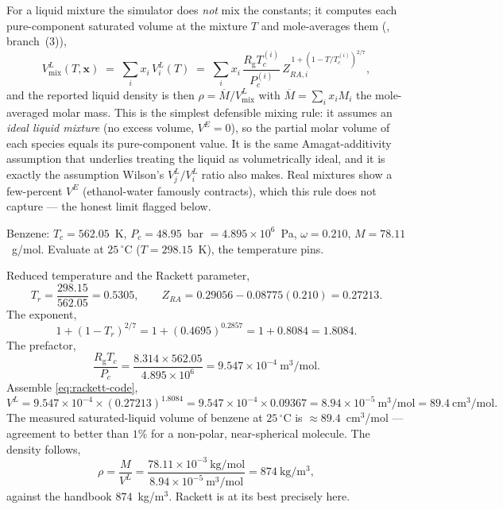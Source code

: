 \documentclass[11pt,a4paper]{article}
\newcommand{\Rgas}{R_{\!\mathrm{g}}}                %
\begin{document}
For a liquid mixture the simulator does \emph{not} mix the constants;
it computes each pure-component saturated volume at the mixture $T$ and
mole-averages them (, branch~(3)),
\begin{equation}\label{eq:rackett-mix}
   V^{L}_{\mathrm{mix}}(T,\mathbf{x})
   \;=\; \sum_i x_i\,V_i^{L}(T)
   \;=\; \sum_i x_i\,\frac{\Rgas T_c^{(i)}}{P_c^{(i)}}\,
         Z_{RA,i}^{\,1+(1-T/T_c^{(i)})^{2/7}},
\end{equation}
and the reported liquid density is then
$\rho = \overline{M}/V^{L}_{\mathrm{mix}}$ with $\overline{M}=\sum_i
x_i M_i$ the mole-averaged molar mass.  This is the simplest
defensible mixing rule: it assumes an \emph{ideal liquid mixture} (no
excess volume, $V^E=0$), so the partial molar volume of each species
equals its pure-component value.  It is the same Amagat-additivity
assumption that underlies treating the liquid as volumetrically ideal,
and it is exactly the assumption Wilson's $V_j^L/V_i^L$ ratio also
makes.  Real mixtures show a few-percent $V^E$ (ethanol-water famously
contracts), which this rule does not capture --- the honest limit
flagged below.

\begin{example}
Benzene: $T_c=562.05$~K, $P_c=48.95$~bar $=4.895\times10^{6}$~Pa,
$\omega=0.210$, $M=78.11$~g/mol.  Evaluate at $25\,^\circ$C
($T=298.15$~K), the temperature  pins.

Reduced temperature and the Rackett parameter,
\[
   T_r = \frac{298.15}{562.05} = 0.5305,
   \qquad
   Z_{RA} = 0.29056 - 0.08775(0.210) = 0.27213 .
\]
The exponent,
\[
   1 + (1-T_r)^{2/7}
   = 1 + (0.4695)^{0.2857}
   = 1 + 0.8084 = 1.8084 .
\]
The prefactor,
\[
   \frac{\Rgas T_c}{P_c}
   = \frac{8.314\times 562.05}{4.895\times10^{6}}
   = 9.547\times10^{-4}~\mathrm{m^3/mol} .
\]
Assemble \eqref{eq:rackett-code},
\[
   V^L = 9.547\times10^{-4}\times (0.27213)^{1.8084}
       = 9.547\times10^{-4}\times 0.09367
       = 8.94\times10^{-5}~\mathrm{m^3/mol}
       = 89.4~\mathrm{cm^3/mol} .
\]
The measured saturated-liquid volume of benzene at $25\,^\circ$C is
$\approx 89.4$~cm$^3$/mol --- agreement to better than $1\%$ for a
non-polar, near-spherical molecule.  The density follows,
\[
   \rho = \frac{M}{V^L}
        = \frac{78.11\times10^{-3}~\mathrm{kg/mol}}
               {8.94\times10^{-5}~\mathrm{m^3/mol}}
        = 874~\mathrm{kg/m^3},
\]
against the handbook $874$~kg/m$^3$.  Rackett is at its best precisely
here.
\end{example}
\end{document}
